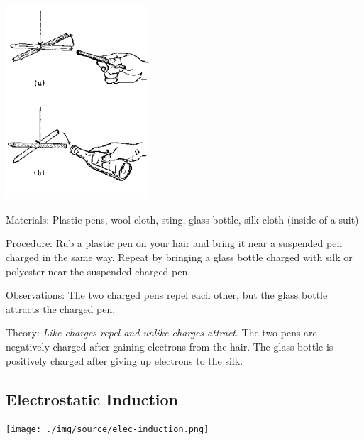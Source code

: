 \begin{multicols}{2}
\begin{center}
\includegraphics[width=0.4\textwidth]{./img/source/law-electrostatics.png}
\end{center}

\begin{description*}
\item[Materials:]{Plastic pens, wool cloth, sting, glass bottle, silk cloth (inside of a suit)}
\item[Procedure:]{Rub a plastic pen on your hair and bring it near a suspended pen charged in the same way. Repeat by bringing a glass bottle charged with silk or polyester near the suspended charged pen.}
\item[Observations:]{The two charged pens repel each other, but the glass bottle attracts the charged pen.}
\item[Theory:]{\emph{Like charges repel and unlike charges attract}. The two pens are negatively charged after gaining electrons from the hair. The glass bottle is positively charged after giving up electrons to the silk.}
\end{description*}

\vfill
\columnbreak

\subsection{Electrostatic Induction}

\begin{center}
\texttt{[image: ./img/source/elec-induction.png]}
\end{center}


\end{multicols}
